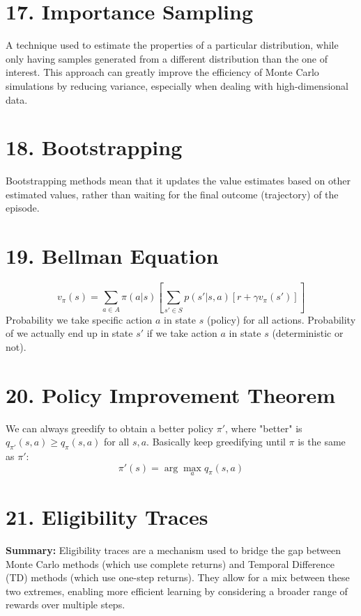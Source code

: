 \documentclass[letterpaper,10pt]{article}
\begin{document}
\begin{multicols}{2}
\section*{17. Importance Sampling}
A technique used to estimate the properties of a particular distribution, while only having samples generated from a different distribution than the one of interest. This approach can greatly improve the efficiency of Monte Carlo simulations by reducing variance, especially when dealing with high-dimensional data.

\section*{18. Bootstrapping}
Bootstrapping methods mean that it updates the value estimates based on other estimated values, rather than waiting for the final outcome (trajectory) of the episode.

\section*{19. Bellman Equation}
\[
v_\pi(s) = \sum_{a \in A} \pi(a | s) \left[ \sum_{s' \in S} p(s' | s, a) [r + \gamma v_\pi(s')]\right]
\]
Probability we take specific action \( a \) in state \( s \) (policy) for all actions.
Probability of we actually end up in state \( s' \) if we take action \( a \) in state \( s \) (deterministic or not).

\section*{20. Policy Improvement Theorem}
We can always greedify to obtain a better policy \(\pi'\), where "better" is \(q_{\pi'}(s,a) \geq q_\pi(s,a)\) for all \(s,a\). Basically keep greedifying until \(\pi\) is the same as \(\pi'\):
\[
\pi'(s) = \arg \max_a q_\pi(s, a)
\]

\section*{21. Eligibility Traces}
\textbf{Summary:} Eligibility traces are a mechanism used to bridge the gap between Monte Carlo methods (which use complete returns) and Temporal Difference (TD) methods (which use one-step returns). They allow for a mix between these two extremes, enabling more efficient learning by considering a broader range of rewards over multiple steps.


\end{multicols}
\end{document}
